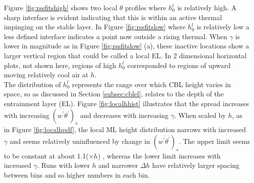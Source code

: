 

Figure \ref{fig:rssfitshigh} shows two local $\theta$ profiles where $h_{0}^{l}$ is relatively high.  
A sharp interface is evident indicating that this is within an active thermal impinging on the stable layer.
In Figure \ref{fig:rssfitslow} where $h_{0}^{l}$ is relatively low a less defined interface indicates 
a point now outside a rising thermal.  When $\gamma$ is lower in magnitude as in Figure \ref{fig:rssfitslow} (a), 
these inactive locations show a larger vertical region that could be called a local \acs{EL}.  
In 2 dimensional horizontal plots, not shown here, regions of high 
$h_{0}^{l}$ corresponded to regions of upward moving relatively cool air at $h$.\\

The distribution of $h_{0}^{l}$ represents the range over which \acs{CBL} height varies in space, so as 
discussed in Section \ref{subsec:cblel}, relates to the depth of the entrainment layer (\acs{EL}).
Figure \ref{fig:localhhist} illustrates that the spread increases with increasing $(\overline{w^{'}\theta^{'}})_{s}$ and decreases with increasing $\gamma$.  When scaled by $h$, as in Figure \ref{fig:localhpdf}, the local \acs{ML} height distribution 
narrows with increased $\gamma$ and seems relatively uninfluenced by change in $(\overline{w^{'}\theta^{'}})_{s}$.  
The upper limit seems to be constant at about 1.1($\times h$) , whereas the lower limit increases 
with increased $\gamma$.   Runs with lower $h$ and narrower $\Delta h$ have relatively 
larger spacing between bins and so higher numbers in each bin.\\

